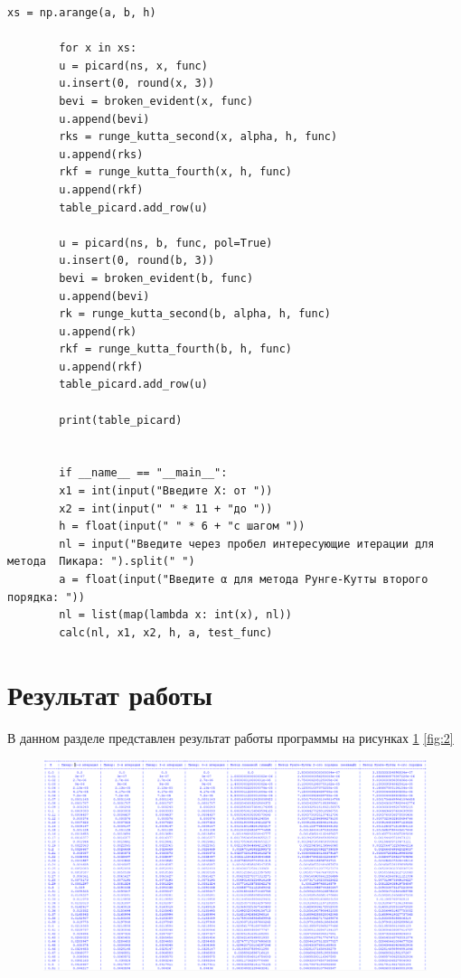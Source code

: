 \documentclass[12pt,a4paper]{scrartcl}
\begin{document}
\begin{lstlisting}[language=MyP]
		xs = np.arange(a, b, h)
		
		for x in xs:
		u = picard(ns, x, func)
		u.insert(0, round(x, 3))
		bevi = broken_evident(x, func)
		u.append(bevi)
		rks = runge_kutta_second(x, alpha, h, func)
		u.append(rks)
		rkf = runge_kutta_fourth(x, h, func)
		u.append(rkf)
		table_picard.add_row(u)
		
		u = picard(ns, b, func, pol=True)
		u.insert(0, round(b, 3))
		bevi = broken_evident(b, func)
		u.append(bevi)
		rk = runge_kutta_second(b, alpha, h, func)
		u.append(rk)
		rkf = runge_kutta_fourth(b, h, func)
		u.append(rkf)
		table_picard.add_row(u)
		
		print(table_picard)
		
		
		if __name__ == "__main__":
		x1 = int(input("Введите X: от "))
		x2 = int(input(" " * 11 + "до "))
		h = float(input(" " * 6 + "с шагом "))
		nl = input("Введите через пробел интересующие итерации для метода  Пикара: ").split(" ")
		a = float(input("Введите α для метода Рунге-Кутты второго порядка: "))
		nl = list(map(lambda x: int(x), nl))
		calc(nl, x1, x2, h, a, test_func)
	\end{lstlisting}
	
	\section{Результат работы}
	В данном разделе представлен результат работы программы на рисунках \ref{fig:1} \ref{fig:2}
	
	\begin{figure}[H]
		\centering
		\includegraphics[width=\linewidth]{1}
		\caption{}
		\label{fig:1}
	\end{figure}
	
\end{document}
